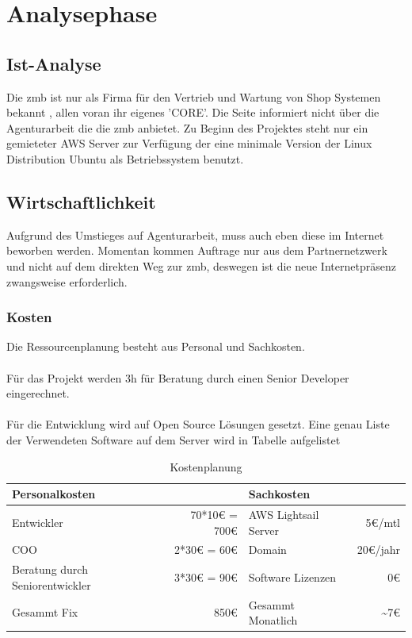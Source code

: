 \documentclass[11pt,a4paper]{article}
\begin{document}
\section{Analysephase}
\subsection{Ist-Analyse}
Die zmb ist nur als Firma für den Vertrieb und Wartung von Shop Systemen bekannt , allen voran ihr eigenes 'CORE'. Die Seite informiert nicht über die Agenturarbeit die die zmb anbietet. 
Zu Beginn des Projektes steht nur ein gemieteter AWS Server zur Verfügung der eine minimale   Version der Linux Distribution Ubuntu als Betriebssystem benutzt. 
\subsection{Wirtschaftlichkeit}
Aufgrund des Umstieges auf Agenturarbeit, muss auch eben diese  im Internet beworben werden. Momentan kommen Auftrage nur aus dem Partnernetzwerk und nicht auf dem direkten Weg zur zmb, deswegen ist die neue Internetpräsenz zwangsweise erforderlich.
\subsubsection{Kosten}
Die Ressourcenplanung besteht aus Personal und Sachkosten.\\\\
Für das Projekt werden 3h für Beratung durch einen Senior Developer eingerechnet.\\\\
Für die Entwicklung wird auf Open Source Lösungen gesetzt. Eine genau Liste der Verwendeten Software auf dem Server wird in Tabelle \pageref{sec:progs} aufgelistet
\begin{table}[!ht]
  \centering
     \begin{tabular}{l|r||l|r}
       \textbf{Personalkosten}  & &\textbf{Sachkosten}& \\
       \hline
       Entwickler      &    70*10€ = 700€    &  AWS Lightsail Server      &     5€/mtl\\
       COO    &  2*30€ = 60€               	    &  Domain & 20€/jahr\\
       Beratung durch Seniorentwickler    &  3*30€ = 90€ & Software Lizenzen & 0€	\\ 
       \hline
       \hline
       Gesammt Fix& 850€ & Gesammt Monatlich & \textasciitilde 7€  \\
     \end{tabular}
\caption{Kostenplanung}
\label{tbl:Kostenplanung}
\end{table}
\end{document}
